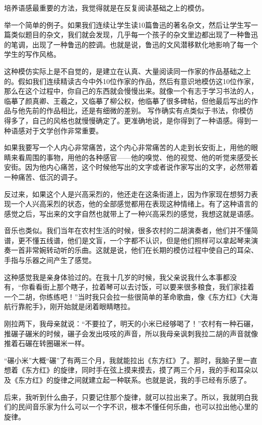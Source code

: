 \documentclass[fontset=fandol,12pt,a5paper]{ctexbook}
\begin{document}
培养语感最重要的方法，我觉得就是在反复阅读基础之上的模仿。

举一个简单的例子。如果我们连续让学生读10篇鲁迅的著名杂文，然后让学生写一篇类似题目的杂文，我们就会发现，几乎每一个孩子的杂文里边都出现了一种鲁迅的笔调，出现了一种鲁迅的腔调。也就是说，鲁迅的文风潜移默化地影响了每一个学生的写作风格。

这种模仿实际上是不自觉的，是建立在认真、大量阅读同一作家的作品基础之上的。假如我们连续精读古今中外10位作家的作品，然后有意识地模仿这10位作家，那么在这个过程中，你自己的东西就会慢慢出来。就像一个有志于学习书法的人，临摹了颜真卿、王羲之，又临摹了柳公权，他临摹了很多碑帖，但他最后写出的作品与他先前的作品相比，还是有细微的差别。
写作确实有点类似于书法，你模仿得多了，自己的风格也就慢慢确定了。更准确地说，是你得到了一种语感。得到一种语感对于文学创作非常重要。

如果我要写一个人内心非常痛苦，这个内心非常痛苦的人走到长安街上，用他的眼睛来看周围的事物，用他的各种感官——他的嗅觉、他的视觉、他的听觉来感受长安街。因为他内心痛苦，这个时候他写出的文字或者说作家写出的文字，必然带着一种痛苦、低沉的调子。

反过来，如果这个人是兴高采烈的，他还走在这条街道上，因为作家现在想努力表现一个人兴高采烈的状态，他的全部感觉都用在表现这种情绪上。有了这种语言的感觉之后，写出来的文字自然也就带上了一种兴高采烈的感觉，我想这就是语感。

音乐也类似。我们当年在农村生活的时候，很多农村的二胡演奏者，他们并不懂简谱，更不懂五线谱，他们是文盲，一个字都不认识，但是他们照样可以拿起琴来演奏一首非常婉转动听的乐曲。这就是说，他们在长期的模仿过程中使自己的耳朵、手指与乐器之间产生了感觉。

这种感觉我是亲身体验过的。在我十几岁的时候，我父亲说我什么本事都没有，“你看看街上那个瞎子，拉着琴可以去讨饭，可以要来很多粮食，我们家挂着一个二胡，你练练吧！”当时我只会拉一些很简单的革命歌曲，像《东方红》《大海航行靠舵手》，刚开始就是闭着眼睛瞎拉。

刚拉两下，我母亲就说：“不要拉了，明天的小米已经够喝了！”农村有一种石碾，推碾子碾米的时候，碾子会发出吱吱的声音，所以我母亲讽刺我拉二胡的声音就像推着石碾在转圈碾米一样。

“碾小米”大概“碾”了有两三个月，我就能拉出《东方红》了。那时，我脑子里一直想着《东方红》的旋律，同时手在弦上摸来摸去，摸了两三个月，我的手和耳朵以及《东方红》的旋律之间就建立起一种联系。也就是说，我的手已经有乐感了。

后来，我听到什么曲子，只要记住那个旋律，就可以拉出来了。所以，我就明白我们的民间音乐家为什么可以一个字不识，根本不懂任何乐曲，也可以拉出他心里的旋律。
\end{document}
